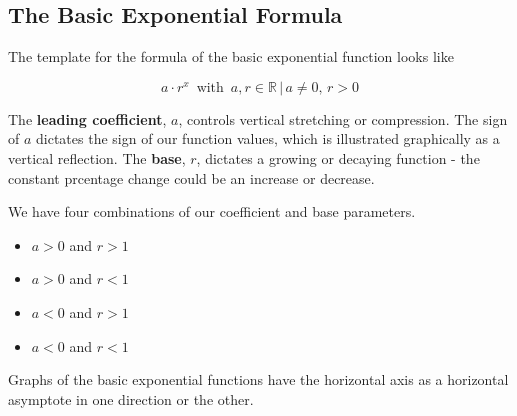 \documentclass{ximera}
\begin{document}
\subsection*{The Basic Exponential Formula}


The template for the formula of the basic exponential function looks like




\[  a \cdot r^x   \, \text{ with } \,  a, r \in \mathbb{R} \, | \,  a \ne 0, \, r > 0   \]


The \textbf{\textcolor{purple!85!blue}{leading coefficient}}, $a$, controls vertical stretching or compression. The sign of $a$ dictates the sign of our function values, which is illustrated graphically as a vertical reflection. The \textbf{\textcolor{purple!85!blue}{base}}, $r$, dictates a growing or decaying function - the constant prcentage change could be an increase or decrease.




We have four combinations of our coefficient and base parameters.

\begin{itemize}
\item $a>0$ and $r>1$
\item $a>0$ and $r<1$
\item $a<0$ and $r>1$
\item $a<0$ and $r<1$
\end{itemize}


Graphs of the basic exponential functions have the horizontal axis as a horizontal asymptote in one direction or the other.
\end{document}
